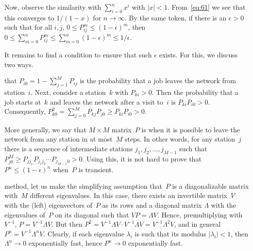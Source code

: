 \documentclass[queueing-book.tex]{subfiles}
\begin{document}
Now, observe the similarity with $\sum_{i=0}^n x^i$ with $|x| < 1$.
From~\cref{eq:61} we see that this converges to $1/(1-x)$ for $n\to \infty$.
By the same token, if there is an $\epsilon>0$ such that for all $i, j$, $0\leq P^m_{ij} \leq (1-\epsilon)^m$, then $0\leq \sum_{m=0}^n P_{ij}^m \leq \sum_{m=0}^n (1-\epsilon)^m \leq 1/\epsilon$.

It remains to find a condition to ensure that such $\epsilon$ exists.  For this, we discuss two ways.

 that $P_{i0} = 1-\sum_{j=1}^M P_{ij}$ is the probability that a job leaves the network from station~$i$.
Next, consider a station~$k$ with $P_{ki} > 0$.
Then the probability that a job starts at~$k$ and leaves the network after a visit to~$i$ is  $P_{ki}P_{i0}>0$.
Consequently, $P^2_{k0} = \sum_{j=0}^M P_{kj}P_{j0} \geq P_{ki}P_{i0} > 0$.


More generally, we say that $M\times M$ matrix~$P$ is  when it is possible to leave the network from any station in at most~$M$ steps.
In other words, for any station~$j$ there is a sequence of intermediate stations $j_1, j_2, \ldots , j_{M-1}$ such that $P^{M}_{j0} \geq P_{j j_1}P_{j_1 j_2}\cdots P_{j_{M-1}0} > 0$.
Using this, it is not hard to prove that $P^n \leq  (1-\epsilon)^n$ when~$P$ is transient.

 method, let us make the simplifying assumption that~$P$ is a diagonalizable matrix with~$M$ different eigenvalues.
In this case, there exists an invertible matrix~$V$ with the (left) eigenvectors of~$P$ as its rows and a diagonal matrix $\Lambda$ with the eigenvalues of~$P$ on its diagonal such that $ V P = \Lambda V$.
Hence, premultiplying with $V^{-1}$, $ P = V^{-1}\Lambda V$.
But then $P^2 = V^{-1}\Lambda V \cdot V^{-1}\Lambda V= V^{-1}\Lambda^2 V$, and in general $P^n = V^{-1}\Lambda^n V$.
Clearly, if each eigenvalue $\lambda_i$ is such that its modulus $|\lambda_i| < 1$, then $\Lambda^n \to 0$ exponentially fast, hence $P^n\to 0$ exponentially fast.
\end{document}
